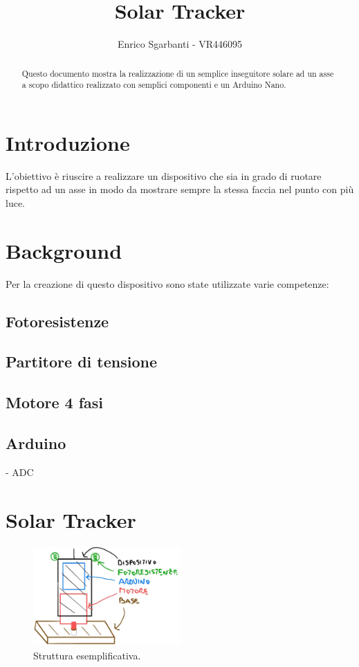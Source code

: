 \documentclass[11pt,oneside,a4paper]{article}
\title{\textbf{Solar Tracker}}
\author{Enrico Sgarbanti - VR446095}
\begin{document}
\maketitle


\begin{abstract}
    Questo documento mostra la realizzazione di un semplice inseguitore solare ad un asse a scopo didattico realizzato con semplici componenti e un Arduino Nano.
\end{abstract}


\section{Introduzione}
L'obiettivo è riuscire a realizzare un dispositivo che sia in grado di ruotare rispetto ad un asse in modo da mostrare sempre la stessa faccia nel punto con più luce.

\section{Background}
Per la creazione di questo dispositivo sono state utilizzate varie competenze:

\subsection{Fotoresistenze}

\subsection{Partitore di tensione}

\subsection{Motore 4 fasi}

\subsection{Arduino}
- ADC

\section{Solar Tracker}
\begin{figure}[h]
    \centering
    \includegraphics[width=0.5\textwidth]{figures/modello_solar_tracker}
    \caption{Struttura esemplificativa.}
\end{figure}
\end{document}
